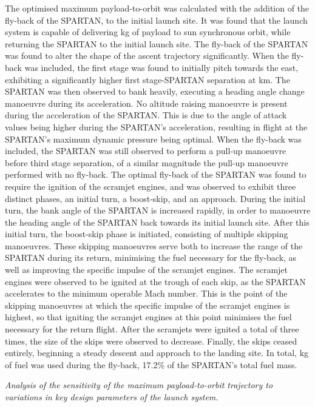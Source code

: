The optimised maximum payload-to-orbit was calculated with the addition of the fly-back of the SPARTAN, to the initial launch site. It was found that the launch system is capable of delivering \PayloadToOrbitStandard kg of payload to sun synchronous orbit, while returning the SPARTAN to the initial launch site. 
	The fly-back of the SPARTAN was found to alter the shape of the ascent trajectory significantly. When the fly-back was included, the first stage was found to initially pitch towards the east, exhibiting a significantly higher first stage-SPARTAN separation at \firstsecondSeparationAltStandard km. The SPARTAN was then observed to bank heavily, executing a heading angle change manoeuvre during its acceleration. No altitude raising manoeuvre is present during the acceleration of the SPARTAN. This is due to the angle of attack values being higher during the SPARTAN's acceleration, resulting in flight at the SPARTAN's maximum dynamic pressure being optimal. 
When the fly-back was included, the SPARTAN was still observed to perform a pull-up manoeuvre before third stage separation, of a similar magnitude the pull-up manoeuvre performed with no fly-back. 
The optimal fly-back of the SPARTAN was found to require the ignition of the scramjet engines, and was observed to exhibit three distinct phases, an initial turn, a boost-skip, and an approach. 
During the initial turn, the bank angle of the SPARTAN is increased rapidly, in order to manoeuvre the heading angle of the SPARTAN back towards its initial launch site. 
After this initial turn, the boost-skip phase is initiated, consisting of multiple skipping manoeuvres. These skipping manoeuvres serve both to increase the range of the SPARTAN during its return, minimising the fuel necessary for the fly-back, as well as improving the specific impulse of the scramjet engines.
 The scramjet engines were observed to be ignited at the trough of each skip, as the SPARTAN accelerates to the minimum operable Mach number. This is the point of the skipping manoeuvres at which the specific impulse of the scramjet engines is highest, so that igniting the scramjet engines at this point minimises the fuel necessary for the return flight. 
 After the scramjets were ignited a total of three times, the size of the skips were observed to decrease. Finally, the skips ceased entirely, beginning a steady descent and approach to the landing site. 
 In total, \returnFuelStandard kg of fuel was used during the fly-back, 17.2\% of the SPARTAN's total fuel mass.
	
	\vspace{10pt}
	\emph{Analysis of the sensitivity of the maximum payload-to-orbit trajectory to variations in key design parameters of the launch system.}
	
